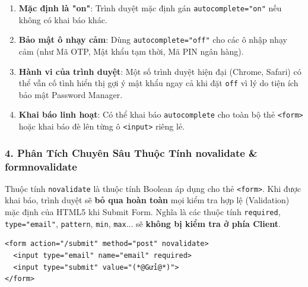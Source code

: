 \documentclass[11pt,oneside]{book}
\newcommand{\codeinline}[1]{\textcolor{accentOrange}{\texttt{#1}}}
\begin{document}
\begin{tipBox}
\begin{enumerate}[leftmargin=1.5em, itemsep=4pt, parsep=0pt]
    \item \textbf{Mặc định là "on"}: Trình duyệt mặc định gán \codeinline{autocomplete="on"} nếu không có khai báo khác.
    \item \textbf{Bảo mật ô nhạy cảm}: Dùng \codeinline{autocomplete="off"} cho các ô nhập nhạy cảm (như Mã OTP, Mật khẩu tạm thời, Mã PIN ngân hàng).
    \item \textbf{Hành vi của trình duyệt}: Một số trình duyệt hiện đại (Chrome, Safari) có thể vẫn cố tình hiển thị gợi ý mật khẩu ngay cả khi đặt \codeinline{off} vì lý do tiện ích bảo mật Password Manager.
    \item \textbf{Khai báo linh hoạt}: Có thể khai báo \codeinline{autocomplete} cho toàn bộ thẻ \codeinline{<form>} hoặc khai báo đè lên từng ô \codeinline{<input>} riêng lẻ.
\end{enumerate}
\end{tipBox}

\subsubsection{4. Phân Tích Chuyên Sâu Thuộc Tính novalidate \& formnovalidate}

\begin{conceptBox}
Thuộc tính \codeinline{novalidate} là thuộc tính Boolean áp dụng cho thẻ \codeinline{<form>}. Khi được khai báo, trình duyệt sẽ \textbf{bỏ qua hoàn toàn} mọi kiểm tra hợp lệ (Validation) mặc định của HTML5 khi Submit Form. Nghĩa là các thuộc tính \codeinline{required}, \codeinline{type="email"}, \codeinline{pattern}, \codeinline{min}, \codeinline{max}... sẽ \textbf{không bị kiểm tra ở phía Client}.
\end{conceptBox}

\begin{codeWindow}
\begin{lstlisting}[language=HTML5]
<form action="/submit" method="post" novalidate>
  <input type="email" name="email" required>
  <input type="submit" value="(*@Gửi@*)">
</form>
\end{lstlisting}
\end{codeWindow}
\end{document}
